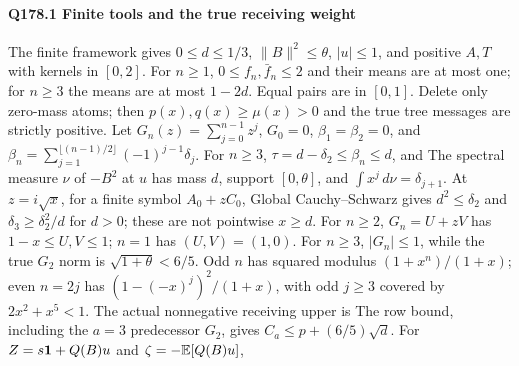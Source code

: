 \paragraph{Q178.1 Finite tools and the true receiving weight}\label{part:Q178.1}
The finite framework gives $0\le\allowbreak  d\le\allowbreak 1/3$, $\|B\|^2\le\allowbreak \theta$, $|u|\le\allowbreak 1$,
and positive $A,\allowbreak T$ with kernels in $[0,\allowbreak 2]$.
For $n\ge\allowbreak 1$, $0\le\allowbreak  f_n,\allowbreak \bar f_n\le\allowbreak 2$ and their means are at most one;
for $n\ge\allowbreak 3$ the means are at most $1-2d$.
Equal pairs are in $[0,\allowbreak 1]$. Delete only zero-mass atoms; then
$p(x),\allowbreak q(x)\ge\allowbreak \mu(x)>\allowbreak 0$ and the true tree messages are strictly positive.
Let $G_n(z)=\allowbreak \sum_{j=\allowbreak 0}^{n-1}z^j$, $G_0=\allowbreak 0$, $\beta_1=\allowbreak \beta_2=\allowbreak 0$, and
$\beta_n=\allowbreak \sum_{j=\allowbreak 1}^{\lfloor(n-1)/2\rfloor}(-1)^{j-1}\delta_j$.
For $n\ge\allowbreak 3$, $\tau=\allowbreak d-\delta_2\le\allowbreak \beta_n\le\allowbreak  d$, and
The spectral measure $\nu$ of $-B^2$ at $u$ has mass $d$, support
$[0,\allowbreak \theta]$, and $\int x^j\,\allowbreak d\nu=\allowbreak \delta_{j+1}$.
At $z=\allowbreak i\sqrt x$, for a finite symbol $A_0+zC_0$,
Global Cauchy--Schwarz gives $d^2\le\allowbreak \delta_2$ and
$\delta_3\ge\allowbreak \delta_2^2/d$ for $d>\allowbreak 0$; these are not pointwise $x\ge\allowbreak  d$.
For $n\ge\allowbreak 2$, $G_n=\allowbreak U+zV$ has $1-x\le\allowbreak  U,\allowbreak V\le\allowbreak 1$;
$n=\allowbreak 1$ has $(U,\allowbreak V)=\allowbreak (1,\allowbreak 0)$.
For $n\ge\allowbreak 3$, $|G_n|\le\allowbreak 1$, while the true $G_2$ norm is
$\sqrt{1+\theta}<\allowbreak 6/5$.
Odd $n$ has squared modulus $(1+x^n)/(1+x)$; even $n=\allowbreak 2j$ has
$(1-(-x)^j)^2/(1+x)$, with odd $j\ge\allowbreak 3$ covered by $2x^2+x^5<\allowbreak 1$.
The actual nonnegative receiving upper is
The row bound, including the $a=\allowbreak 3$ predecessor $G_2$, gives
$C_a\le\allowbreak  p+(6/5)\sqrt d$.
For $Z=\allowbreak s\mathbf1+Q(B)u$ and $\zeta=\allowbreak -\mathbb E[Q(B)u]$,
